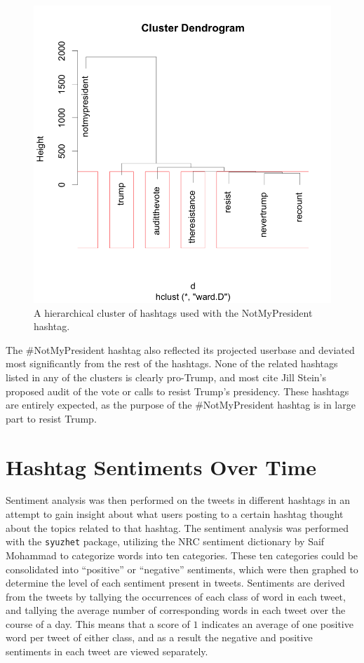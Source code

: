 \documentclass[prodmode]{acmsmall} %
\begin{document}
\begin{figure}
\begin{minipage}[b]{.49\textwidth}
    \includegraphics[width = \textwidth]{cluster-notmypresident}
\caption{A hierarchical cluster of hashtags used with the NotMyPresident hashtag.}
\label{notmypresident cluster}
\end{minipage}
\end{figure}

The \#NotMyPresident hashtag also reflected its projected userbase and deviated
most significantly from the rest of the hashtags. None of the related hashtags
listed in any of the clusters is clearly pro-Trump, and most cite Jill Stein's
proposed audit of the vote or calls to resist Trump's presidency. These hashtags
are entirely expected, as the purpose of the \#NotMyPresident hashtag is in
large part to resist Trump.

\section{Hashtag Sentiments Over Time}
Sentiment analysis was then performed on the tweets in different hashtags in an
attempt to gain insight about what users posting to a certain hashtag thought
about the topics related to that hashtag. The sentiment analysis was performed
with the \verb|syuzhet| package, utilizing the NRC sentiment dictionary by Saif
Mohammad \cite{nrc} to categorize words into ten categories. These ten categories could be
consolidated into ``positive'' or ``negative'' sentiments, which were then
graphed to determine the level of each sentiment present in tweets. Sentiments
are derived from the tweets by tallying the occurrences of each class of word in
each tweet, and tallying the average number of corresponding words in each tweet
over the course of a day. This means that a score of $1$ indicates an average of
one positive word per tweet of either class, and as a result the negative and
positive sentiments in each tweet are viewed separately. 
\end{document}
